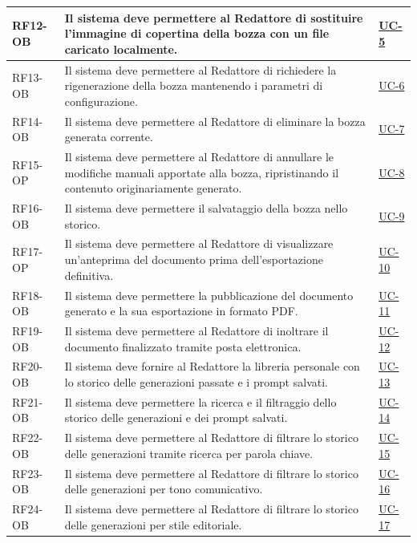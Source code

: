 ﻿\documentclass[a4paper,12pt]{article}
\begin{document}
\begin{description}[style=multiline, leftmargin=4cm, font=\bfseries]
\begin{enumerate}[leftmargin=*, nosep]
{\begin{longtable}{|p{2.5cm}|p{9.5cm}|p{3.5cm}|}
    \hline
    RF12-OB & Il sistema deve permettere al Redattore di sostituire l'immagine di copertina della bozza con un file caricato localmente. & \hyperref[fig:uc-5]{UC-5} \\
    \hline
    RF13-OB & Il sistema deve permettere al Redattore di richiedere la rigenerazione della bozza mantenendo i parametri di configurazione. & \hyperref[fig:uc-6]{UC-6} \\
    \hline
    RF14-OB & Il sistema deve permettere al Redattore di eliminare la bozza generata corrente. & \hyperref[fig:uc-7]{UC-7} \\
    \hline
    RF15-OP & Il sistema deve permettere al Redattore di annullare le modifiche manuali apportate alla bozza, ripristinando il contenuto originariamente generato. & \hyperref[fig:uc-8]{UC-8} \\
    \hline
    RF16-OB & Il sistema deve permettere il salvataggio della bozza nello storico. & \hyperref[fig:uc-9]{UC-9} \\
    \hline
    RF17-OP & Il sistema deve permettere al Redattore di visualizzare un'anteprima del documento prima dell'esportazione definitiva. & \hyperref[fig:uc-10]{UC-10} \\
    \hline
    RF18-OB & Il sistema deve permettere la pubblicazione del documento generato e la sua esportazione in formato PDF. & \hyperref[fig:uc-11]{UC-11} \\
    \hline
    RF19-OB & Il sistema deve permettere al Redattore di inoltrare il documento finalizzato tramite posta elettronica. & \hyperref[fig:uc-12]{UC-12} \\
    \hline
    RF20-OB & Il sistema deve fornire al Redattore la libreria personale con lo storico delle generazioni passate e i prompt salvati. & \hyperref[fig:uc-13]{UC-13} \\
    \hline
    RF21-OB & Il sistema deve permettere la ricerca e il filtraggio dello storico delle generazioni e dei prompt salvati. & \hyperref[fig:uc-14]{UC-14} \\
    \hline
    RF22-OB & Il sistema deve permettere al Redattore di filtrare lo storico delle generazioni tramite ricerca per parola chiave. & \hyperref[fig:uc-15]{UC-15} \\
    \hline
    RF23-OB & Il sistema deve permettere al Redattore di filtrare lo storico delle generazioni per tono comunicativo. & \hyperref[fig:uc-16]{UC-16} \\
    \hline
    RF24-OB & Il sistema deve permettere al Redattore di filtrare lo storico delle generazioni per stile editoriale. & \hyperref[fig:uc-17]{UC-17} \\

\end{longtable}}
\end{enumerate}
\end{description}
\end{document}
